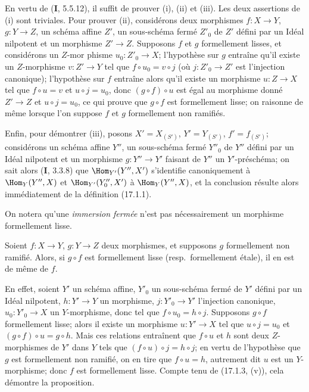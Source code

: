 En vertu de (\textbf{I}, 5.5.12), il suffit de prouver (i), (ii) et (iii). Les deux assertions de (i) sont triviales. Pour prouver (ii), considérons deux morphismes $f:X\to Y$, $g:Y\to Z$, un schéma affine $Z'$, un sous-schéma fermé $Z'_0$ de $Z'$ défini par un Idéal nilpotent et un morphisme $Z'\to Z$. Supposons $f$ et $g$ formellement lisses, et considérons un
$Z$-mor%
phisme $u_0:Z'_0\to X$; l'hypothèse sur $g$ entraîne qu'il existe un $Z$-morphisme $v:Z'\to Y$ tel que $f\circ u_0=v\circ j$ (où $j:Z'_0\to Z'$ est l'injection canonique); l'hypothèse sur $f$ entraîne alors qu'il existe un morphisme $u:Z\to X$ tel que $f\circ u=v$ et $u\circ j=u_0$, donc $(g\circ f)\circ u$ est égal au morphisme donné $Z'\to Z$ et $u\circ j=u_0$, ce qui prouve que $g\circ f$ est formellement lisse; on raisonne de même lorsque l'on suppose $f$ et $g$ formellement non ramifiés.

Enfin, pour démontrer (iii), posons $X'=X_{(S')}$, $Y'=Y_{(S')}$, $f'=f_{(S')}$; considérons un schéma affine $Y''$, un sous-schéma fermé $Y''_0$ de $Y''$ défini par un Idéal nilpotent et un morphisme $g:Y''\to Y'$ faisant de $Y''$ un $Y'$-préschéma; on sait alors (\textbf{I}, 3.3.8) que $\Hom_{Y'}(Y'',X')$ s'identifie canoniquement à $\Hom_Y(Y'',X)$ et $\Hom_{Y'}(Y''_0,X')$ à $\Hom_Y(Y'',X)$, et la conclusion résulte alors immédiatement de la définition (17.1.1).

On notera qu'une \emph{immersion fermée} n'est pas nécessairement un morphisme formellement lisse.

\begin{proposition}[17.1.4]
\label{IV.17.1.4}
Soient $f:X\to Y$, $g:Y\to Z$ deux morphismes, et supposons $g$ formellement non ramifié. Alors, si $g\circ f$ est formellement lisse \textup{(resp.}\ formellement étale\textup{)}, il en est de même de $f$.
\end{proposition}

En effet, soient $Y'$ un schéma affine, $Y'_0$ un sous-schéma fermé de $Y'$ défini par un Idéal nilpotent, $h:Y'\to Y$ un morphisme, $j:Y'_0\to Y'$ l'injection canonique, $u_0:Y'_0\to X$ un $Y$-morphisme, donc tel que $f\circ u_0=h\circ j$. Supposons $g\circ f$ formellement lisse; alors il existe un morphisme $u:Y'\to X$ tel que $u\circ j=u_0$ et $(g\circ f)\circ u=g\circ h$. Mais ces relations entraînent que $f\circ u$ et $h$ sont deux $Z$-morphismes de $Y'$ dans $Y$ tels que $(f\circ u)\circ j=h\circ j$; en vertu de l'hypothèse que $g$ est formellement non ramifié, on en tire que $f\circ u=h$, autrement dit $u$ est un $Y$-morphisme; donc $f$ est formellement lisse. Compte tenu de (17.1.3, (v)), cela démontre la proposition.


